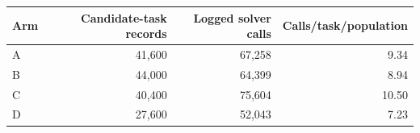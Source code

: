 \begin{tabular}{@{}lrrr@{}}
\toprule
Arm & Candidate-task records & Logged solver calls & Calls/task/population \\
\midrule
A & 41,600 & 67,258 & 9.34 \\
B & 44,000 & 64,399 & 8.94 \\
C & 40,400 & 75,604 & 10.50 \\
D & 27,600 & 52,043 & 7.23 \\
\bottomrule
\end{tabular}
